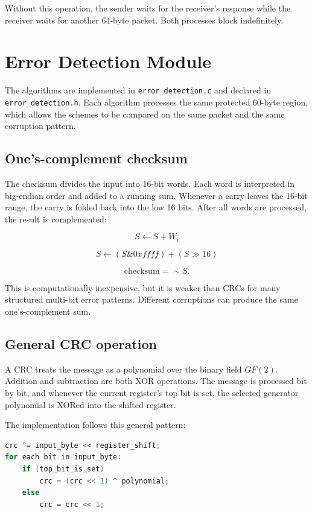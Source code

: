 \documentclass[12pt,a4paper]{article}
\begin{document}
Without this operation, the sender waits for the receiver's response while
the receiver waits for another 64-byte packet. Both processes block
indefinitely.

\section{Error Detection Module}

The algorithms are implemented in \texttt{error\_detection.c} and declared
in \texttt{error\_detection.h}. Each algorithm processes the same protected
60-byte region, which allows the schemes to be compared on the same packet
and the same corruption pattern.

\subsection{One's-complement checksum}

The checksum divides the input into 16-bit words. Each word is interpreted in
big-endian order and added to a running sum. Whenever a carry leaves the
16-bit range, the carry is folded back into the low 16 bits. After all words
are processed, the result is complemented:

\[
S \leftarrow S + W_i
\]

\[
S \leftarrow (S \mathbin{\&} 0xffff) + (S \mathbin{\gg} 16)
\]

\[
\mathrm{checksum} = \mathop{\sim}S.
\]

This is computationally inexpensive, but it is weaker than CRCs for many
structured multi-bit error patterns. Different corruptions can produce the
same one's-complement sum.

\subsection{General CRC operation}

A CRC treats the message as a polynomial over the binary field
$GF(2)$. Addition and subtraction are both XOR operations. The message is
processed bit by bit, and whenever the current register's top bit is set, the
selected generator polynomial is XORed into the shifted register.

The implementation follows this general pattern:

\begin{lstlisting}[language=C]
crc ^= input_byte << register_shift;
for each bit in input_byte:
    if (top_bit_is_set)
        crc = (crc << 1) ^ polynomial;
    else
        crc = crc << 1;
\end{lstlisting}
\end{document}
